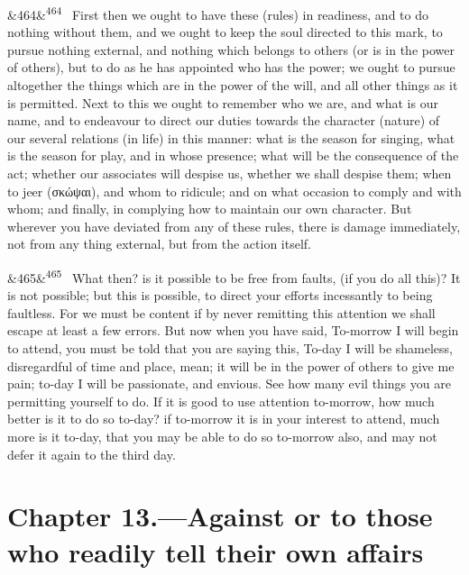 \documentclass[12pt]{article}
\newcommand{\para}[1][]{\par\noindent\ifx&#1&\else\textsuperscript{\footnotesize #1}~\fi}
\begin{document}
\para[464] First then we ought to have these (rules) in readiness, and to do nothing without them, and we ought to keep the soul directed to this mark, to pursue nothing external, and nothing which belongs to others (or is in the power of others), but to do as he has appointed who has the power; we ought to pursue altogether the things which are in the power of the will, and all other things as it is permitted. Next to this we ought to remember who we are, and what is our name, and to endeavour to direct our duties towards the character (nature) of our several relations (in life) in this manner: what is the season for singing, what is the season for play, and in whose presence; what will be the consequence of the act; whether our associates will despise us, whether we shall despise them; when to jeer (σκώψαι), and whom to ridicule; and on what occasion to comply and with whom; and finally, in complying how to maintain our own character. But wherever you have deviated from any of these rules, there is damage immediately, not from any thing external, but from the action itself.

\para[465] What then? is it possible to be free from faults, (if you do all this)? It is not possible; but this is possible, to direct your efforts incessantly to being faultless. For we must be content if by never remitting this attention we shall escape at least a few errors. But now when you have said, To-morrow I will begin to attend, you must be told that you are saying this, To-day I will be shameless, disregardful of time and place, mean; it will be in the power of others to give me pain; to-day I will be passionate, and envious. See how many evil things you are permitting yourself to do. If it is good to use attention to-morrow, how much better is it to do so to-day? if to-morrow it is in your interest to attend, much more is it to-day, that you may be able to do so to-morrow also, and may not defer it again to the third day.

\section*{Chapter 13.---Against or to those who readily tell their own affairs}
\end{document}
